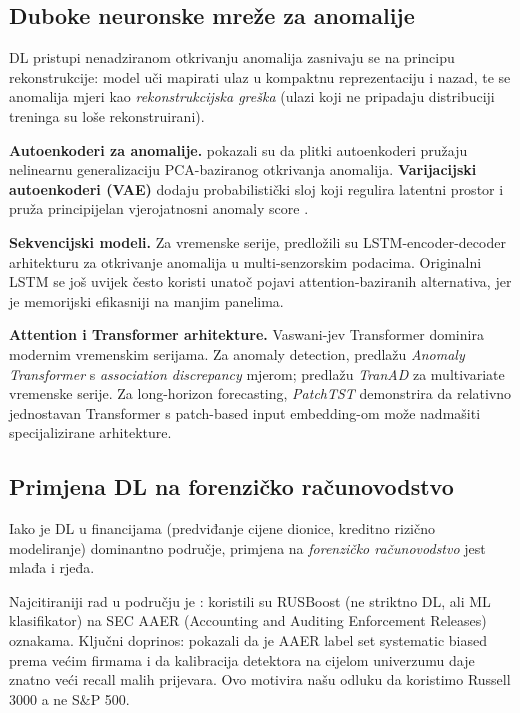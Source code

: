 \documentclass[diplomskirad,authoryear]{fer}
\begin{document}
\subsection{Duboke neuronske mreže za anomalije}

DL pristupi nenadziranom otkrivanju anomalija zasnivaju se na principu rekonstrukcije: model uči mapirati ulaz u kompaktnu reprezentaciju i nazad, te se anomalija mjeri kao \emph{rekonstrukcijska greška} (ulazi koji ne pripadaju distribuciji treninga su loše rekonstruirani).

\textbf{Autoenkoderi za anomalije.} \citet{sakurada2014} pokazali su da plitki autoenkoderi pružaju nelinearnu generalizaciju PCA-baziranog otkrivanja anomalija. \textbf{Varijacijski autoenkoderi (VAE)} \citep{kingma2014, higgins2017} dodaju probabilistički sloj koji regulira latentni prostor i pruža principijelan vjerojatnosni anomaly score \citep{an2015}.

\textbf{Sekvencijski modeli.} Za vremenske serije, \citet{malhotra2016} predložili su LSTM-encoder-decoder arhitekturu za otkrivanje anomalija u multi-senzorskim podacima. Originalni LSTM \citep{hochreiter1997} se još uvijek često koristi unatoč pojavi attention-baziranih alternativa, jer je memorijski efikasniji na manjim panelima.

\textbf{Attention i Transformer arhitekture.} Vaswani-jev Transformer \citep{vaswani2017} dominira modernim vremenskim serijama. Za anomaly detection, \citet{xu2022} predlažu \emph{Anomaly Transformer} s \emph{association discrepancy} mjerom; \citet{tuli2022} predlažu \emph{TranAD} za multivariate vremenske serije. Za long-horizon forecasting, \emph{PatchTST} \citep{nie2023} demonstrira da relativno jednostavan Transformer s patch-based input embedding-om može nadmašiti specijalizirane arhitekture.

\subsection{Primjena DL na forenzičko računovodstvo}

Iako je DL u financijama (predviđanje cijene dionice, kreditno rizično modeliranje) dominantno područje, primjena na \emph{forenzičko računovodstvo} jest mlađa i rjeđa.

Najcitiraniji rad u području je \citet{bao2020}: koristili su RUSBoost (ne striktno DL, ali ML klasifikator) na SEC AAER (Accounting and Auditing Enforcement Releases) oznakama. Ključni doprinos: pokazali da je AAER label set systematic biased prema većim firmama i da kalibracija detektora na cijelom univerzumu daje znatno veći recall malih prijevara. Ovo motivira našu odluku da koristimo Russell 3000 a ne S\&P 500.
\end{document}
